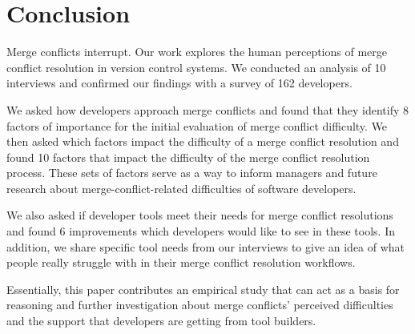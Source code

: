 \section{Conclusion}\label{conclusion}
Merge conflicts interrupt. 
Our work explores the human perceptions of merge conflict resolution in version control systems. We conducted an analysis of 10 interviews and confirmed our findings with a survey of 162 developers.

We asked how developers approach merge conflicts and found that they identify 8 factors of importance for the initial evaluation of merge conflict difficulty. 
We then asked which factors impact the difficulty of a merge conflict resolution and found 10 factors that impact the difficulty of the merge conflict resolution process. 
These sets of factors serve as a way to inform managers and future research about merge-conflict-related difficulties of software developers.

We also asked if developer tools meet their needs for merge conflict resolutions and found 6 improvements which developers would like to see in these tools. In addition, we share specific tool needs from our interviews to give an idea of what people really struggle with in their merge conflict resolution workflows.

Essentially, this paper contributes an empirical study that can act as a basis for reasoning and further investigation about merge conflicts' perceived difficulties and the support that developers are getting from tool builders. 